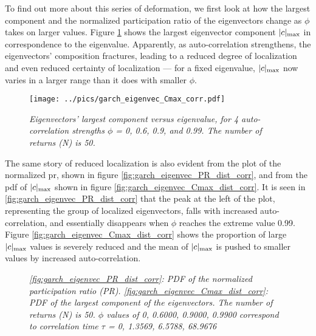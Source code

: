 \documentclass{report}
\begin{document}
To find out more about this series of deformation, we first look at
how the largest component and the normalized participation ratio of
the eigenvectors change as $\phi$ takes on larger values. Figure
\ref{fig:garch_eigenvec_Cmax_corr} shows the largest eigenvector
component $|c|_{\text{max}}$ in correspondence to the eigenvalue. Apparently, as
auto-correlation strengthens, the eigenvectors' composition
fractures, leading to a reduced degree of localization and even
reduced certainty of localization --- for a fixed eigenvalue, $|c|_{\text{max}}$
now varies in a larger range than it does with smaller $\phi$.
\begin{figure}[htb!]
  \centering
  \texttt{[image: ../pics/garch\_eigenvec\_Cmax\_corr.pdf]}
  \caption{\small \it Eigenvectors' largest component versus
    eigenvalue, for 4 auto-correlation strengths $\phi$ = 0, 0.6, 0.9,
    and 0.99. The number of returns (N) is 50.}
  \label{fig:garch_eigenvec_Cmax_corr}
\end{figure}
The same story of reduced localization is also evident from the plot
of the normalized \gls{pr}, shown in figure
\ref{fig:garch_eigenvec_PR_dist_corr}, and from the \gls{pdf} of $|c|_{\text{max}}$
shown in figure \ref{fig:garch_eigenvec_Cmax_dist_corr}. It is seen
in \ref{fig:garch_eigenvec_PR_dist_corr} that the peak at the left 
of the plot, representing the group of localized eigenvectors, falls
with increased auto-correlation, and essentially disappears when
$\phi$ reaches the extreme value 0.99. Figure
\ref{fig:garch_eigenvec_Cmax_dist_corr} shows the proportion of large
$|c|_{\text{max}}$ values is severely reduced and the mean of $|c|_{\text{max}}$ is pushed
to smaller values by increased auto-correlation.
\begin{figure}[htb!]
  \centering
  \caption{\small \it \ref{fig:garch_eigenvec_PR_dist_corr}: PDF of
    the normalized participation ratio
    (PR). \ref{fig:garch_eigenvec_Cmax_dist_corr}: PDF of the largest
    component of the eigenvectors. The number of returns (N) is
    50. $\phi$ values of 0, 0.6000, 0.9000, 0.9900 correspond to
    correlation time $\tau$ = 0, 1.3569, 6.5788, 68.9676}
\end{figure}
\end{document}
